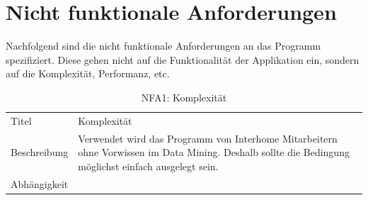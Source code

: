 \section{Nicht funktionale Anforderungen}
\label{sec:anforderungsanalyse:nichtfunktionaleanforderung}
Nachfolgend sind die nicht funktionale Anforderungen an das Programm spezifiziert. Diese gehen nicht auf die Funktionalität der Applikation ein, sondern auf die Komplexität, Performanz, etc.


\begin{table}[H] 
	\caption{NFA1: Komplexität}
	\centering
	\label{fig:anforderungsanalyse:nichtfunktionaleanforderung:nfa1}
	\begin{tabular}{ | l | L{10cm} | } 
		\hline 
		 \\ \hline 
		Titel & Komplexität \\ \hline 
		Beschreibung & Verwendet wird das Programm von Interhome Mitarbeitern ohne Vorwissen im Data Mining. Deshalb sollte die Bedingung möglichst einfach ausgelegt sein. \\ \hline 
		Abhängigkeit & \\ \hline 
	\end{tabular}
\end{table}

